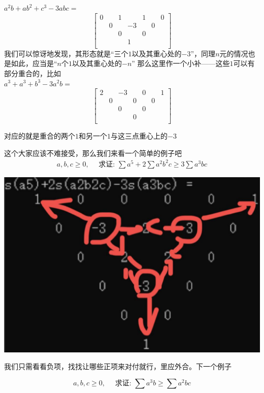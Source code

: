 \documentclass[UTF8]{ctexart}
\begin{document}
$ a^{2}b+ab^{2}+c^{3}-3abc= $
\renewcommand*{\arraystretch}{1.732}\[\left[\begin{matrix}
	0& & 1& &1& & 0\\
	& 0& & -3& &0 &\\
	& & 0& &0& & \\
	& & & 1& & &\\
\end{matrix}\right]\]
我们可以惊讶地发现，其形态就是“三个$ 1 $以及其重心处的$ -3 $”，同理$ n $元的情况也是如此，应当是“$ n $个$ 1 $以及其重心处的$ -n $”
那么这里作一个小补——这些$ 1 $可以有部分重合的，比如\\
$ a^{3}+a^{3}+b^{3}-3a^{2}b= $
\renewcommand*{\arraystretch}{1.732}\[\left[\begin{matrix}
	2& & -3& &0& & 1\\
	& 0& & 0& &0 &\\
	& & 0& &0& & \\
	& & & 0& & &\\
\end{matrix}\right]\]

对应的就是重合的两个$ 1 $和另一个$ 1 $与这三点重心上的$ -3 $

这个大家应该不难接受，那么我们来看一个简单的例子吧
$$
\begin{gathered}
	a, b, c \geq 0, \quad \text { 求证: } \sum a^{5}+2 \sum a^{2} b^{2} c \geq 3 \sum a^{3} b c
\end{gathered}
$$
\begin{center}
	\includegraphics[width=0.4\linewidth]{12}
\end{center}

我们只需看看负项，找找让哪些正项来对付就行，里应外合。下一个例子

$$ a, b, c \geq 0, \quad \text { 求证: } \sum a^{3} b \geq \sum a^{2} b c
$$
\end{document}
